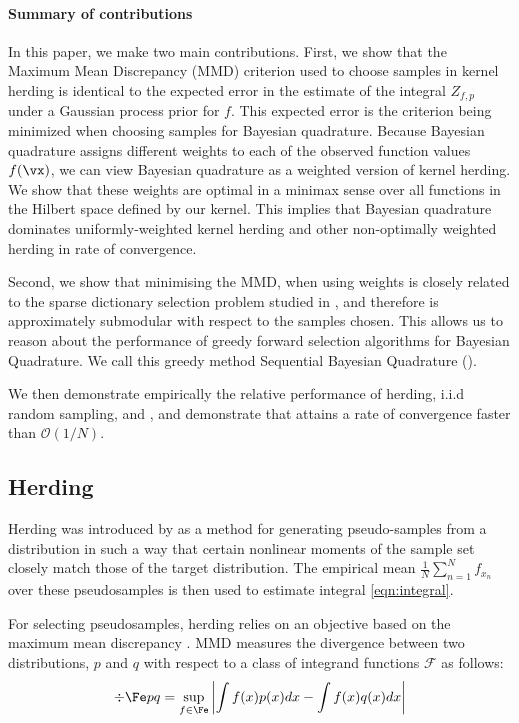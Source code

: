 \paragraph{Summary of contributions} In this paper, we make two main contributions.  First, we show that the Maximum Mean Discrepancy (MMD) criterion used to choose samples in kernel herding is identical to the expected error in the estimate of the integral $Z_{f,p}$ under a Gaussian process prior for $f$.  This expected error is the criterion being minimized when choosing samples for Bayesian quadrature.  Because Bayesian quadrature assigns different weights to each of the observed function values $f(\vx)$, we can view Bayesian quadrature as a weighted version of kernel herding.  We show that these weights are optimal in a minimax sense over all functions in the Hilbert space defined by our kernel.  This implies that Bayesian quadrature dominates uniformly-weighted kernel herding and other non-optimally weighted herding in rate of convergence.

Second, we show that minimising the MMD, when using \bq{} weights is closely related to the sparse dictionary selection problem studied in \citep{KrauseCevher10}, and therefore is approximately submodular with respect to the samples chosen. This allows us to reason about the performance of greedy forward selection algorithms for Bayesian Quadrature. We call this greedy method Sequential Bayesian Quadrature (\sbq{}).

We then demonstrate empirically the relative performance of herding, i.i.d random sampling, and \sbq{}, and demonstrate that \sbq{} attains a rate of convergence faster than $\mathcal{O}(1/N)$.



\subsection{Herding} 

Herding was introduced by \citep{welling2009herding} as a method for generating pseudo-samples from a distribution in such a way that certain nonlinear moments of the sample set closely match those of the target distribution.  The empirical mean $\frac{1}{N}\sum_{n=1}^{N}f_{x_n}$ over these pseudosamples is then used to estimate integral \ref{eqn:integral}.

For selecting pseudosamples, herding relies on an objective based on the maximum mean discrepancy \citep[MMD;\ ][]{Sriperumbudur2008}. MMD measures the divergence between two distributions, $p$ and $q$ with respect to a class of integrand functions $\mathcal{F}$ as follows:
%
\begin{align}
	\div{\Fe}{p}{q} = \sup_{f\in\Fe}\left\vert\int f(x) p(x) dx - \int f(x) q(x) dx \right\vert
\end{align}


